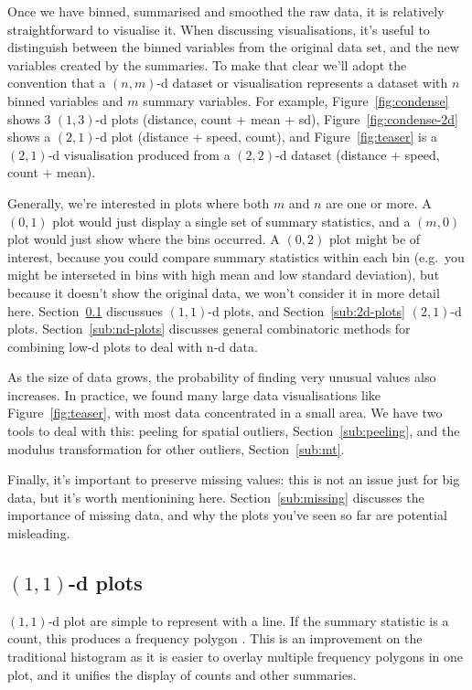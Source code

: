 \documentclass[journal]{vgtc}                %
\begin{document}
Once we have binned, summarised and smoothed the raw data, it is relatively straightforward to visualise it. When discussing visualisations, it's useful to distinguish between the binned variables from the original data set, and the new variables created by the summaries. To make that clear we'll adopt the convention that a $(n, m)$-d dataset or visualisation represents a dataset with $n$ binned variables and $m$ summary variables. For example, Figure~\ref{fig:condense} shows 3 $(1, 3)$-d plots (distance, count + mean + sd), Figure~\ref{fig:condense-2d} shows a $(2, 1)$-d plot (distance + speed, count), and Figure~\ref{fig:teaser} is a $(2, 1)$-d visualisation produced from a $(2, 2)$-d dataset (distance + speed, count + mean).

Generally, we're interested in plots where both $m$ and $n$ are one or more. A $(0, 1)$ plot would just display a single set of summary statistics, and a $(m, 0)$ plot would just show where the bins occurred. A $(0, 2)$ plot might be of interest, because you could compare summary statistics within each bin (e.g.\ you might be interseted in bins with high mean and low standard deviation), but because it doesn't show the original data, we won't consider it in more detail here. Section~\ref{sub:1d-plots} discussues $(1, 1)$-d plots, and Section~\ref{sub:2d-plots} $(2, 1)$-d plots. Section~\ref{sub:nd-plots} discusses general combinatoric methods for combining low-d plots to deal with n-d data.

As the size of data grows, the probability of finding very unusual values also increases. In practice, we found many large data visualisations like Figure~\ref{fig:teaser}, with most data concentrated in a small area. We have two tools to deal with this: peeling for spatial outliers, Section~\ref{sub:peeling}, and the modulus transformation for other outliers, Section~\ref{sub:mt}.

Finally, it's important to preserve missing values: this is not an issue just for big data, but it's worth mentionining here. Section~\ref{sub:missing} discusses the importance of missing data, and why the plots you've seen so far are potential misleading.

\subsection{\texorpdfstring{$(1,1)$}{(1, 1)}-d plots}
\label{sub:1d-plots}

$(1,1)$-d plot are simple to represent with a line. If the summary statistic is a count, this produces a frequency polygon \citep{scott:1985a}. This is an improvement on the traditional histogram as it is easier to overlay multiple frequency polygons in one plot, and it unifies the display of counts and other summaries. 
\end{document}
